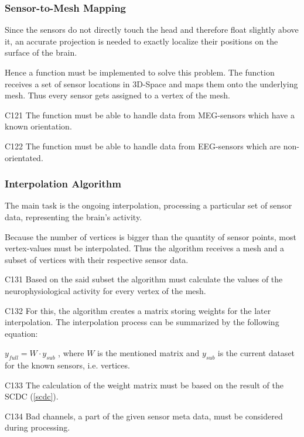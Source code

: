 \subsubsection{Sensor-to-Mesh Mapping} \label{projection}

	Since the sensors do not directly touch the head and therefore float slightly above it, an accurate projection is needed to 
	exactly localize their positions on the surface of the brain. %
	
	Hence a function must be implemented to solve this problem. 
	The function receives a set of sensor locations in 3D-Space and maps them onto the underlying mesh. Thus every 			sensor gets assigned to a vertex of the mesh. 

	\begin{aims}
	
		\item[C121] The function must be able to handle data from MEG-sensors which have a known orientation.
		\item[C122] The function must be able to handle data from EEG-sensors which are non-orientated.
	
	\end{aims}

\subsubsection{Interpolation Algorithm} \label{interpolation} 

	The main task is the ongoing interpolation, processing a particular set of sensor data, representing the brain's 			activity.
	
	Because the number of vertices is bigger than the quantity of sensor points, most vertex-values must be interpolated.
	Thus the algorithm receives a mesh and a subset of vertices with their respective sensor data.  
	
	\begin{aims}
	
		\item[C131] Based on the said subset the algorithm must calculate the values of the neurophysiological activity for every vertex of the mesh.
		\item[C132] For this, the algorithm creates a matrix storing weights for the later interpolation.
					The interpolation process can be summarized by the following equation: 
					
					$y_{full} = W \cdot y_{sub}$
					, where $W$ is the mentioned matrix and $y_{sub}$ is the current dataset for the known sensors, i.e. 							vertices.
		\item[C133] The calculation of the weight matrix must be based on the result of the SCDC (\ref{scdc}).
		\item[C134] Bad channels, a part of the given sensor meta data, must be considered during processing. 
	
	\end{aims}

